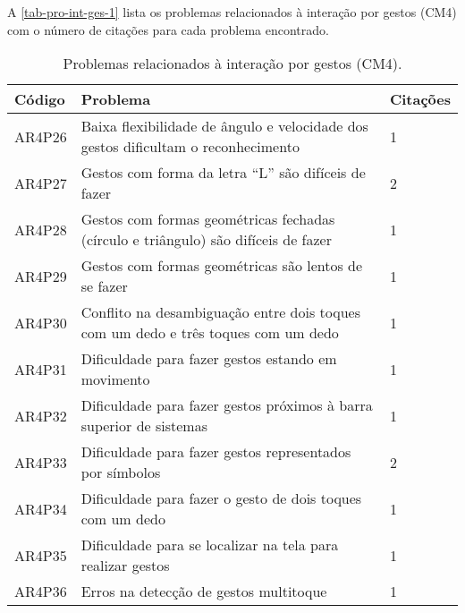 A \autoref{tab-pro-int-ges-1} lista os problemas relacionados à interação por gestos (CM4) com o número de citações para cada problema encontrado.

\begin{table}[htb]
  \begin{center}
    \ABNTEXfontereduzida
    \caption{Problemas relacionados à interação por gestos (CM4).}
    \label{tab-pro-int-ges-1}
    \begin{tabular}{p{1.2cm}|p{12.0cm}|p{1.2cm}}
      \textbf{Código} & \textbf{Problema}                                                                  & \textbf{Citações} \\
      \hline
      AR4P26          & Baixa flexibilidade de ângulo e velocidade dos gestos dificultam o reconhecimento  & 1                 \\
      \hline
      AR4P27          & Gestos com forma da letra “L” são difíceis de fazer                                & 2                 \\
      \hline
      AR4P28          & Gestos com formas geométricas fechadas (círculo e triângulo) são difíceis de fazer & 1                 \\
      \hline
      AR4P29          & Gestos com formas geométricas são lentos de se fazer                               & 1                 \\
      \hline
      AR4P30          & Conflito na desambiguação entre dois toques com um dedo e três toques com um dedo  & 1                 \\
      \hline
      AR4P31          & Dificuldade para fazer gestos estando em movimento                                 & 1                 \\
      \hline
      AR4P32          & Dificuldade para fazer gestos próximos à barra superior de sistemas                & 1                 \\
      \hline
      AR4P33          & Dificuldade para fazer gestos representados por símbolos                           & 2                 \\
      \hline
      AR4P34          & Dificuldade para fazer o gesto de dois toques com um dedo                          & 1                 \\
      \hline
      AR4P35          & Dificuldade para se localizar na tela para realizar gestos                         & 1                 \\
      \hline
      AR4P36          & Erros na detecção de gestos multitoque                                             & 1                 \\

\end{tabular}
\end{center}
\end{table}
